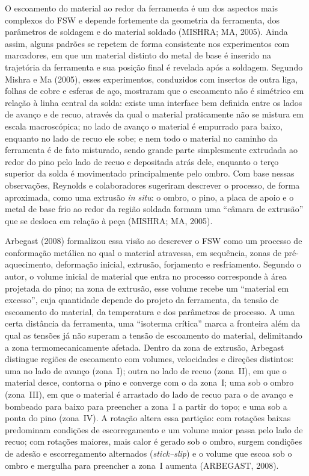 \documentclass[12pt,openany]{report}
\begin{document}
O escoamento do material ao redor da ferramenta é um dos aspectos mais complexos do FSW e depende fortemente da geometria da ferramenta, dos parâmetros de soldagem e do material soldado (MISHRA; MA, 2005). Ainda assim, alguns padrões se repetem de forma consistente nos experimentos com marcadores, em que um material distinto do metal de base é inserido na trajetória da ferramenta e sua posição final é revelada após a soldagem. Segundo Mishra e Ma (2005), esses experimentos, conduzidos com insertos de outra liga, folhas de cobre e esferas de aço, mostraram que o escoamento não é simétrico em relação à linha central da solda: existe uma interface bem definida entre os lados de avanço e de recuo, através da qual o material praticamente não se mistura em escala macroscópica; no lado de avanço o material é empurrado para baixo, enquanto no lado de recuo ele sobe; e nem todo o material no caminho da ferramenta é de fato misturado, sendo grande parte simplesmente extrudada ao redor do pino pelo lado de recuo e depositada atrás dele, enquanto o terço superior da solda é movimentado principalmente pelo ombro. Com base nessas observações, Reynolds e colaboradores sugeriram descrever o processo, de forma aproximada, como uma extrusão \textit{in situ}: o ombro, o pino, a placa de apoio e o metal de base frio ao redor da região soldada formam uma ``câmara de extrusão'' que se desloca em relação à peça (MISHRA; MA, 2005).

Arbegast (2008) formalizou essa visão ao descrever o FSW como um processo de conformação metálica no qual o material atravessa, em sequência, zonas de pré-aquecimento, deformação inicial, extrusão, forjamento e resfriamento. Segundo o autor, o volume inicial de material que entra no processo corresponde à área projetada do pino; na zona de extrusão, esse volume recebe um ``material em excesso'', cuja quantidade depende do projeto da ferramenta, da tensão de escoamento do material, da temperatura e dos parâmetros de processo. A uma certa distância da ferramenta, uma ``isoterma crítica'' marca a fronteira além da qual as tensões já não superam a tensão de escoamento do material, delimitando a zona termomecanicamente afetada. Dentro da zona de extrusão, Arbegast distingue regiões de escoamento com volumes, velocidades e direções distintos: uma no lado de avanço (zona~I); outra no lado de recuo (zona~II), em que o material desce, contorna o pino e converge com o da zona~I; uma sob o ombro (zona~III), em que o material é arrastado do lado de recuo para o de avanço e bombeado para baixo para preencher a zona~I a partir do topo; e uma sob a ponta do pino (zona~IV). A rotação altera essa partição: com rotações baixas predominam condições de escorregamento e um volume maior passa pelo lado de recuo; com rotações maiores, mais calor é gerado sob o ombro, surgem condições de adesão e escorregamento alternados (\textit{stick--slip}) e o volume que escoa sob o ombro e mergulha para preencher a zona~I aumenta (ARBEGAST, 2008).
\end{document}
